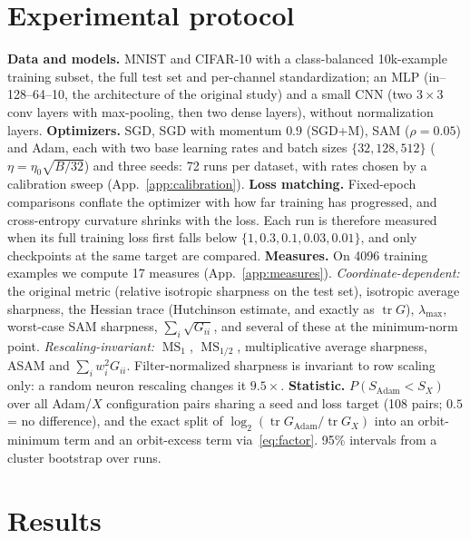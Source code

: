 \documentclass[10pt,twocolumn]{article}
\theoremstyle{remark}
\newcommand{\tr}{\operatorname{tr}}
\newcommand{\MS}{\operatorname{MS}}
\begin{document}
\section{Experimental protocol}\label{sec:protocol}
\textbf{Data and models.} MNIST and CIFAR-10 with a class-balanced 10k-example training subset, the full test set and per-channel standardization; an MLP (in--128--64--10, the architecture of the original study) and a small CNN (two $3{\times}3$ conv layers with max-pooling, then two dense layers), without normalization layers.
\textbf{Optimizers.} SGD, SGD with momentum $0.9$ (SGD+M), SAM ($\rho=0.05$) and Adam, each with two base learning rates and batch sizes $\{32,128,512\}$ ($\eta=\eta_0\sqrt{B/32}$) and three seeds: 72 runs per dataset, with rates chosen by a calibration sweep (App.~\ref{app:calibration}).
\textbf{Loss matching.} Fixed-epoch comparisons conflate the optimizer with how far training has progressed, and cross-entropy curvature shrinks with the loss. Each run is therefore measured when its full training loss first falls below $\{1,0.3,0.1,0.03,0.01\}$, and only checkpoints at the same target are compared.
\textbf{Measures.} On 4096 training examples we compute 17 measures (App.~\ref{app:measures}). \emph{Coordinate-dependent:} the original metric (relative isotropic sharpness on the test set), isotropic average sharpness, the Hessian trace (Hutchinson estimate, and exactly as $\tr G$), $\lambda_{\max}$, worst-case SAM sharpness, $\sum_i\sqrt{G_{ii}}$, and several of these at the minimum-norm point. \emph{Rescaling-invariant:} $\MS_1$, $\MS_{1/2}$, multiplicative average sharpness, ASAM \citep{kwon2021asam} and $\sum_iw_i^2G_{ii}$. Filter-normalized sharpness \citep{li2018visualizing} is invariant to row scaling only: a random neuron rescaling changes it $9.5\times$.
\textbf{Statistic.} $P(S_{\mathrm{Adam}}<S_X)$ over all Adam/$X$ configuration pairs sharing a seed and loss target (108 pairs; $0.5$ = no difference), and the exact split of $\log_2(\tr G_{\mathrm{Adam}}/\tr G_X)$ into an orbit-minimum term and an orbit-excess term via~\eqref{eq:factor}. 95\% intervals from a cluster bootstrap over runs.

\section{Results}
\end{document}
